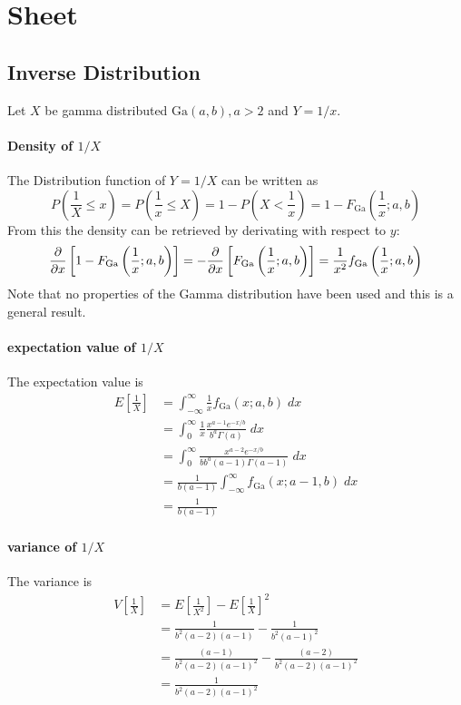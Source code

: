 \section{Sheet}
\subsection*{Inverse Distribution}
Let $X$ be gamma distributed $\text{Ga}\left(a,b\right),a>2$ and $Y = 1/x$.
\paragraph{Density of $1/X$}
The Distribution function of $Y=1/X$ can be written as
\begin{equation}
    P\left(\frac{1}{X}\leq x\right)=P\left(\frac{1}{x}\leq X\right)=1-P\left(X<\frac{1}{x}\right)=1-F_{\text{Ga}}\left(\frac{1}{x};a,b\right)
\end{equation}
From this the density can be retrieved by derivating with respect to $y$:
\begin{equation}
    \pdv{x}\left[1-F_{\text{Ga}}\left(\frac{1}{x};a,b\right)\right]=-\pdv{x}\left[F_{\text{Ga}}\left(\frac{1}{x};a,b\right)\right]=\frac{1}{x^2}f_{\text{Ga}}\left(\frac{1}{x};a,b\right)
\end{equation}
Note that no properties of the Gamma distribution have been used and this is a general result.
\paragraph{expectation value of $1/X$}
The expectation value is
\begin{align}
    E\left[\frac{1}{X}\right]&=\int_{-\infty}^{\infty}\frac{1}{x}f_{\text{Ga}}\left(x;a,b\right)\;dx
    \\&=\int_0^\infty \frac{1}{x}\frac{x^{a-1}e^{-x/b}}{b^a\Gamma\left(a\right)}\;dx
    \\&=\int_0^\infty \frac{x^{a-2}e^{-x/b}}{bb^a\left(a-1\right)\Gamma\left(a-1\right)}\;dx
    \\&=\frac{1}{b\left(a-1\right)}\int_{-\infty}^\infty f_\text{Ga}\left(x;a-1,b\right)\;dx
    \\&=\frac{1}{b\left(a-1\right)}
\end{align}
\paragraph{variance of $1/X$}
The variance is
\begin{align}
    V\left[\frac{1}{X}\right]&=E\left[\frac{1}{X^2}\right]-E\left[\frac{1}{X}\right]^2
    \\&=\frac{1}{b^2\left(a-2\right)\left(a-1\right)}-\frac{1}{b^2\left(a-1\right)^2}
    \\&=\frac{\left(a-1\right)}{b^2\left(a-2\right)\left(a-1\right)^2}-\frac{\left(a-2\right)}{b^2\left(a-2\right)\left(a-1\right)^2}
    \\&=\frac{1}{b^2\left(a-2\right)\left(a-1\right)^2}
\end{align}
